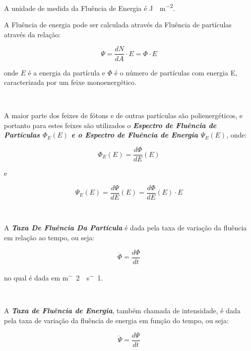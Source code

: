 \documentclass[11pt,a4paper]{article}
\newcounter{exemplo}
\begin{document}
		\begin{exemplo}[Unidade]
			A unidade de medida da Fluência de Energia é \unit{J \cdot m^{-2}}.
		\end{exemplo}

      	\noindent  A Fluência de energia pode ser calculada através da Fluência de partículas através da relação:

			\begin{equation}
			\Psi = \frac{d N}{d A} \cdot E = \Phi \cdot E
			\end{equation}
      
      	\noindent onde $E$ é a energia da partícula e $\Phi$ é o número de partículas com energia E, caracterizada por um feixe monoenergético. 

    	\

    	A maior parte dos feixes de fótons e de outras partículas são polienergéticos, e portanto para estes feixes são utilizados o \textit{\textbf{\textcolor{CarnationPink}{Espectro de Fluência de Partículas $\Phi_E(E)$ e o Espectro de Fluência de Energia $\Psi_E(E)$}}}, onde:

			\begin{equation}
			\Phi_E(E) = \frac{d \Phi}{dE}(E)
			\end{equation}

      	\noindent e

			\begin{equation}
			\Psi_E(E) = \frac{d \Psi}{d E}(E) = \frac{d \Phi}{dE}(E) \cdot E 
			\end{equation}

		\

		A \textit{\textbf{\textcolor{CarnationPink}{Taxa De Fluência Da Partícula}}} é dada pela taxa de variação da fluência em relação ao tempo, ou seja:

			\begin{equation}
				\dot{\Phi} = \frac{d \Phi}{d t}
			\end{equation}

		\noindent no qual é dada em \unit{m^-2 \cdot s^-1}.

		\

		A \textit{\textbf{\textcolor{CarnationPink}{Taxa de Fluência de Energia}}}, também chamada de intensidade, é dada pela taxa de variação da fluência de energia em função do tempo, ou seja:

			\begin{equation}
				\dot{\Psi} = \frac{d \Psi}{d t}
			\end{equation}
		
\end{document}
